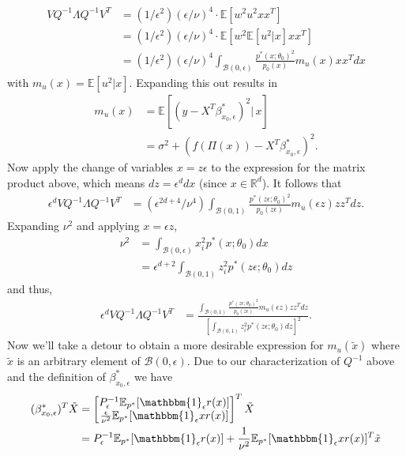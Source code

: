 \documentclass[11pt]{article}
\begin{document}
\begin{align*}
    VQ^{-1}\Lambda Q^{-1}V^T&= (1/\epsilon^2)(\epsilon/\nu)^{4} \cdot \mathbb{E}\left[w^2u^2xx^T\right] \\
    &= (1/\epsilon^2)(\epsilon/\nu)^{4} \cdot \mathbb{E}\left[w^2\mathbb{E}[u^2|x]xx^T\right]\\
    &= (1/\epsilon^2)(\epsilon/\nu)^{4}\int_{\mathcal{B}(0, \epsilon)} \frac{p^*(x; \theta_0)^2}{p_0(x)}m_u(x)xx^T dx
\end{align*}
with $m_u(x) = \mathbb{E}[u^2|x]$. Expanding this out results in
\begin{align*}
    m_u(x) &= \mathbb{E}\left[(y - X^T \beta^*_{x_0, \epsilon})^2 \big| \,x\right] \\
    &= \sigma^2 + \left(f(\Pi(x)) - X^T\beta^*_{x_0, \epsilon}\right)^2.
\end{align*}
Now apply the change of variables $x = z\epsilon$ to the expression for the matrix product above, which means $dz = \epsilon^ddx$ (since $x \in \mathbb{R}^d$). It follows that
\begin{align*}
    \epsilon^dVQ^{-1}\Lambda Q^{-1}V^T &= (\epsilon^{2d+4}/\nu^{4})\int_{\mathcal{B}(0, 1)} \frac{p^*(z\epsilon; \theta_0)^2}{p_0(z\epsilon)}m_u(\epsilon z)zz^T dz.
\end{align*}
Expanding $\nu^2$ and applying $x = \epsilon z$,
\begin{align*}
    \nu^2 &= \int_{\mathcal{B}(0, \epsilon)}x_i^2 p^*(x; \theta_0)dx \\
    &= \epsilon^{d+2} \int_{\mathcal{B}(0, 1)}z_i^2p^*(z\epsilon; \theta_0) dz
\end{align*}
and thus,
\begin{align}
    \epsilon^dVQ^{-1}\Lambda Q^{-1}V^T &= \frac{\int_{\mathcal{B}(0, 1)} \frac{p^*(z\epsilon; \theta_0)^2}{p_0(z\epsilon)}m_u(\epsilon z)zz^T dz}{\left[\int_{\mathcal{B}(0, 1)}z_i^2p^*(z\epsilon; \theta_0) dz\right]^2}. \label{eq: asymp var intermediate}
\end{align}
Now we'll take a detour to obtain a more desirable expression for $m_u(\tilde x)$ where $\tilde{x}$ is an arbitrary element of $\mathcal{B}(0, \epsilon)$. Due to our characterization of $Q^{-1}$ above and the definition of $\beta^*_{x_0, \epsilon}$ we have
\begin{align*}
    (\beta^*_{x_0, \epsilon})^T \tilde X &= \begin{bmatrix}
        P_{\epsilon}^{-1}\mathbb{E}_{p^*}[\mathbbm{1}_{\epsilon}r(x)] \\ \frac{\epsilon}{\nu^2}\mathbb{E}_{p^*}[\mathbbm{1}_{\epsilon}xr(x)]
    \end{bmatrix}^T \tilde X \\
    &= P_{\epsilon}^{-1}\mathbb{E}_{p^*}[\mathbbm{1}_{\epsilon}r(x)] + \frac{1}{\nu^2}\mathbb{E}_{p^*}[\mathbbm{1}_{\epsilon}xr(x)]^T \tilde x
\end{align*}
\end{document}

